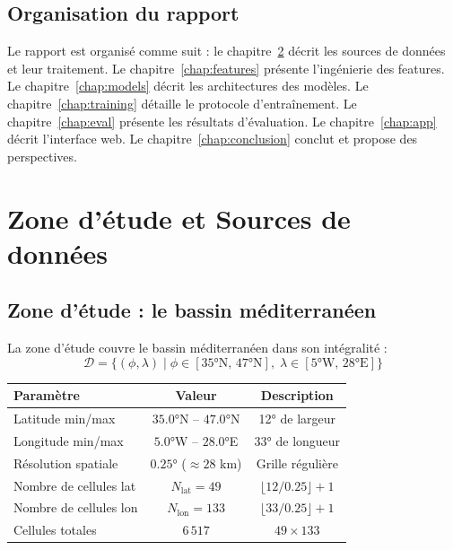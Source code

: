 \documentclass[12pt,a4paper]{report}
\begin{document}
\section{Organisation du rapport}

Le rapport est organisé comme suit : le chapitre~\ref{chap:data} décrit les sources de
données et leur traitement. Le chapitre~\ref{chap:features} présente l'ingénierie des
features. Le chapitre~\ref{chap:models} décrit les architectures des modèles. Le
chapitre~\ref{chap:training} détaille le protocole d'entraînement. Le
chapitre~\ref{chap:eval} présente les résultats d'évaluation. Le
chapitre~\ref{chap:app} décrit l'interface web. Le
chapitre~\ref{chap:conclusion} conclut et propose des perspectives.

\clearpage

\chapter{Zone d'étude et Sources de données}
\label{chap:data}

\section{Zone d'étude : le bassin méditerranéen}

La zone d'étude couvre le bassin méditerranéen dans son intégralité :
\begin{equation}
  \mathcal{D} = \{(\phi, \lambda) \mid \phi \in [35°\text{N},\, 47°\text{N}],\;
  \lambda \in [5°\text{W},\, 28°\text{E}]\}
\end{equation}

\begin{center}
\begin{tabular}{lcc}
\toprule
\rowcolor{fireOrange!15}
\textbf{Paramètre} & \textbf{Valeur} & \textbf{Description} \\
\midrule
Latitude min/max    & $35.0°$N -- $47.0°$N  & 12° de largeur \\
Longitude min/max   & $5.0°$W -- $28.0°$E   & 33° de longueur \\
Résolution spatiale & $0.25°$ ($\approx 28$ km) & Grille régulière \\
Nombre de cellules lat & $N_\text{lat} = 49$    & $\lfloor 12/0.25 \rfloor + 1$ \\
Nombre de cellules lon & $N_\text{lon} = 133$   & $\lfloor 33/0.25 \rfloor + 1$ \\
Cellules totales    & $6\,517$                  & $49 \times 133$ \\
\bottomrule
\end{tabular}
\end{center}
\end{document}

